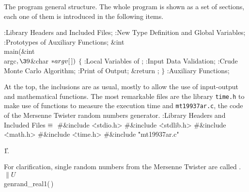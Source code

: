 The program general structure. The whole program is shown as a set of
sections, each one of them is introduced in the following items.

\Y\B{}:Library Headers and Included Files\X;\6
:New Type Definition and Global Variables\X;\6
:Prototypes of Auxiliary Functions\X;\7
\&{int} \\{main}(\&{int} \\{argc}${},\39{}$\&{char} ${}{*}\\{argv}[\,]){}$\1\1%
\2\2\6
${}\{{}$\1\6
:Local Variables of \X;\6
:Input Data Validation\X;\6
:Crude Monte Carlo Algorithm\X;\6
:Print of Output\X;\6
\&{return} ;\6
\4${}\}{}$\2\7
:Auxiliary Functions\X;\par
\fi

At the top, the inclusions are as usual, mostly to allow the use of
input-output and mathematical functions. The most remarkable files are the
library {\tt time.h} to make use of functions to measure the execution time and
{\tt mt19937ar.c}, the code of the Mersenne Twister random numbers generator.
\Y\B\4:Library Headers and Included Files\X${}\equiv{}$\6
\8\#\&{include} \.{<stdio.h>}\6
\8\#\&{include} \.{<stdlib.h>}\6
\8\#\&{include} \.{<math.h>}\6
\8\#\&{include} \.{<time.h>}\6
\8\#\&{include} \.{"mt19937ar.c"}\par
\U1.\fi

For clarification, single random numbers from the Mersenne Twister are called
.
\Y\B\4\D$\|U$ \5
\\{genrand\_real1}(\,)\par
\fi

